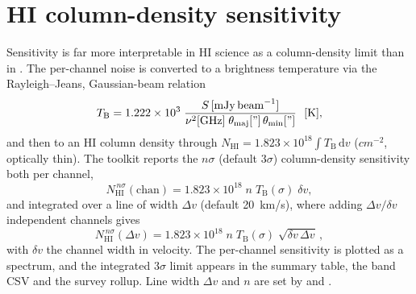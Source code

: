 \documentclass[11pt,a4paper]{article}
\begin{document}
\section{HI column-density sensitivity}\label{sec:nhi}
Sensitivity is far more interpretable in HI science as a column-density limit
than in \mjybeam. The per-channel noise is converted to a brightness
temperature via the Rayleigh--Jeans, Gaussian-beam relation
\begin{equation}
  T_{\mathrm B} = 1.222\times10^{3}\;
  \frac{S\,[\si{mJy.beam^{-1}}]}{\nu^2[\si{GHz}]\;\theta_{\mathrm{maj}}["]\,\theta_{\mathrm{min}}["]}\ \ [\si{K}],
  \label{eq:tb}
\end{equation}
and then to an HI column density through
$N_{\mathrm{HI}} = 1.823\times10^{18}\!\int T_{\mathrm B}\,\mathrm{d}v$
($\si{cm^{-2}}$, optically thin). The toolkit reports the $n\sigma$ (default
$3\sigma$) column-density sensitivity both per channel,
\begin{equation}
  N_{\mathrm{HI}}^{\,n\sigma}(\text{chan}) =
  1.823\times10^{18}\; n\; T_{\mathrm B}(\sigma)\;\delta v,
\end{equation}
and integrated over a line of width $\Delta v$ (default \SI{20}{km/s}), where
adding $\Delta v/\delta v$ independent channels gives
\begin{equation}
  N_{\mathrm{HI}}^{\,n\sigma}(\Delta v) =
  1.823\times10^{18}\; n\; T_{\mathrm B}(\sigma)\;\sqrt{\delta v\,\Delta v}\,,
  \label{eq:nhi}
\end{equation}
with $\delta v$ the channel width in velocity. The per-channel sensitivity is
plotted as a spectrum, and the integrated $3\sigma$ limit appears in the summary
table, the band CSV and the survey rollup. Line width $\Delta v$ and $n$ are set
by  and .

\end{document}
